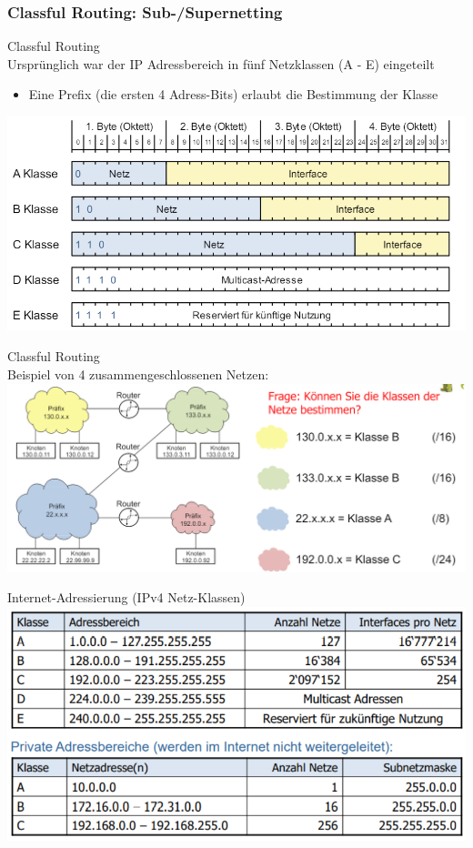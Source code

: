\subsubsection{Classful Routing: Sub-/Supernetting}

\begin{concept}{Classful Routing}\\
    Ursprünglich war der IP Adressbereich in fünf Netzklassen (A - E) eingeteilt
    \begin{itemize}
        \item Eine Prefix (die ersten 4 Adress-Bits) erlaubt die Bestimmung der Klasse
    \end{itemize}
        \includegraphics[width=1\linewidth]{images/classfulrouitng.png}
\end{concept}

\begin{example2}{Classful Routing}\\
    Beispiel von 4 zusammengeschlossenen Netzen:\\
        \includegraphics[width=1\linewidth]{images/classful_routing.png}
\end{example2}

\begin{KR}{Internet-Adressierung (IPv4 Netz-Klassen)}\\
    \includegraphics[width=0.9\linewidth]{images/ipv4.png}
\end{KR}

